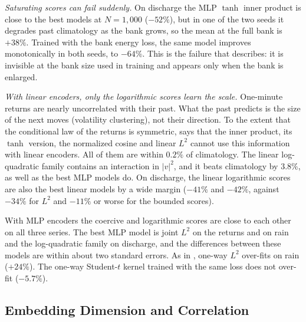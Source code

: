 \documentclass[11pt]{article}
\theoremstyle{plain}
\theoremstyle{definition}
\theoremstyle{remark}
\newcommand{\abs}[1]{\left\lvert #1 \right\rvert}
\begin{document}
\emph{Saturating scores can fail suddenly.} On discharge the MLP $\tanh$
inner product is close to the best models at $N=1{,}000$ ($-52\%$), but in
one of the two seeds it degrades past climatology as the bank grows, so the
mean at the full bank is $+38\%$. Trained with the bank energy loss, the same
model improves monotonically in both seeds, to $-64\%$. This is the failure
that  describes: it is invisible at the bank size used in
training and appears only when the bank is enlarged.

\emph{With linear encoders, only the logarithmic scores learn the scale.}
One-minute returns are nearly uncorrelated with their past. What the past
predicts is the size of the next moves (volatility clustering), not their
direction. To the extent that the conditional law of the returns is symmetric,
 says that the inner product, its $\tanh$ version, the
normalized cosine and linear $L^2$ cannot use this information with linear
encoders. All of
them are within $0.2\%$ of climatology. The linear log-quadratic family
contains an interaction in $\abs{v}^2$, and it beats climatology by $3.8\%$,
as well as the best MLP models do. On discharge, the linear logarithmic scores
are also the best linear models by a wide margin ($-41\%$ and $-42\%$, against
$-34\%$ for $L^2$ and $-11\%$ or worse for the bounded scores).

With MLP encoders the coercive and logarithmic scores are close to each other
on all three series. The best MLP model is joint $L^2$ on the returns and on
rain and the log-quadratic family on discharge, and the differences between
these models are within about two standard errors. As in
, one-way $L^2$ over-fits on rain ($+24\%$). The one-way
Student-$t$ kernel trained with the same loss does not over-fit ($-5.7\%$).

\subsection{Embedding Dimension and Correlation}
\label{ssec:dimsweep}
\end{document}
